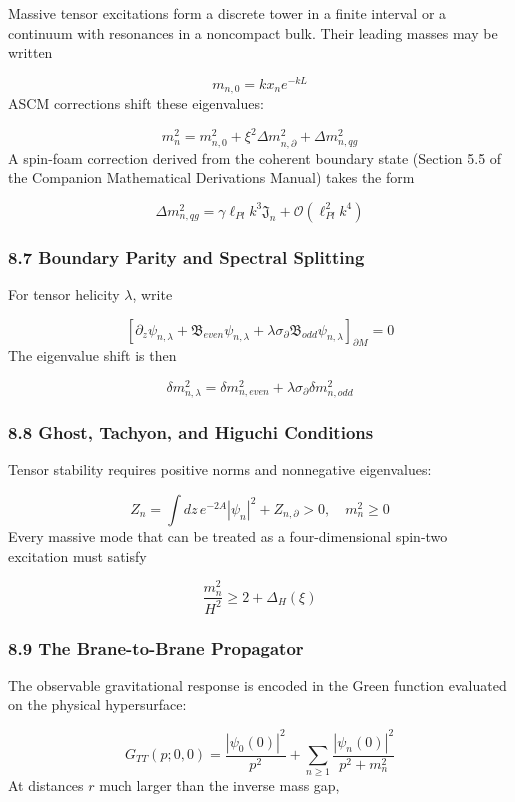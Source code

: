\documentclass[aps,prd,onecolumn,superscriptaddress,nofootinbib,longbibliography,10pt]{revtex4-2}
\begin{document}
  Massive tensor excitations form a discrete tower in a finite interval or a continuum with resonances in a noncompact bulk. Their leading masses may be written


  \[ m_{n,0} = k x_n e^{-kL} \]
  ASCM corrections shift these eigenvalues:


  \[ m_n^2 = m_{n,0}^2 + \xi^2 \Delta m_{n,\partial}^2 + \Delta m_{n,qg}^2 \]
  A spin-foam correction derived from the coherent boundary state (Section 5.5 of the Companion Mathematical Derivations Manual) takes the form


  \[ \Delta m_{n,qg}^2 = \gamma \ell_{Pl} k^3 \mathfrak{J}_n + \mathcal{O}(\ell_{Pl}^2 k^4) \]

  
\subsubsection*{8.7 Boundary Parity and Spectral Splitting}

  For tensor helicity \(\lambda\), write


  \[ \left[ \partial_z \psi_{n,\lambda} + \mathfrak{B}_{even}\psi_{n,\lambda} + \lambda\sigma_\partial \mathfrak{B}_{odd}\psi_{n,\lambda} \right]_{\partial M} = 0 \]
  The eigenvalue shift is then


  \[ \delta m_{n,\lambda}^2 = \delta m_{n,even}^2 + \lambda\sigma_\partial \delta m_{n,odd}^2 \]

  
\subsubsection*{8.8 Ghost, Tachyon, and Higuchi Conditions}

  Tensor stability requires positive norms and nonnegative eigenvalues:


  \[ Z_n = \int dz\, e^{-2A}|\psi_n|^2 + Z_{n,\partial} > 0, \quad m_n^2 \ge 0 \]
  Every massive mode that can be treated as a four-dimensional spin-two excitation must satisfy


  \[ \frac{m_n^2}{H^2} \ge 2 + \Delta_H(\xi) \]

  
\subsubsection*{8.9 The Brane-to-Brane Propagator}

  The observable gravitational response is encoded in the Green function evaluated on the physical hypersurface:


  \[ G_{TT}(p; 0, 0) = \frac{|\psi_0(0)|^2}{p^2} + \sum_{n\ge 1} \frac{|\psi_n(0)|^2}{p^2 + m_n^2} \]
  At distances \(r\) much larger than the inverse mass gap,
\end{document}

